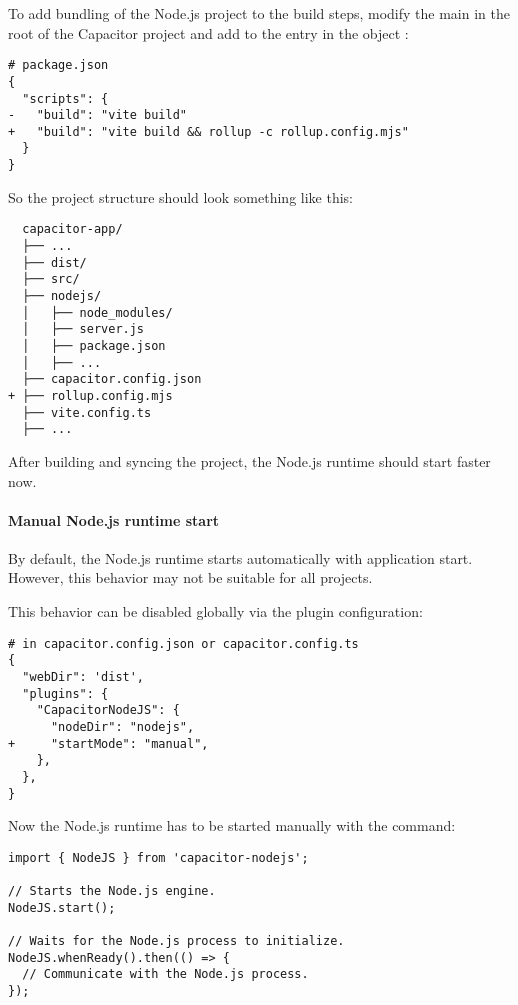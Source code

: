 To add bundling of the Node.js project to the build steps, modify the main  in the root of the Capacitor project 
and add  to the  entry in the  object \cite{npm, rollup}:

\begin{verbatim}
# package.json
{
  "scripts": {
-   "build": "vite build"
+   "build": "vite build && rollup -c rollup.config.mjs"
  }
}
\end{verbatim}

So the project structure should look something like this:

\begin{verbatim}
  capacitor-app/
  ├── ...
  ├── dist/
  ├── src/
  ├── nodejs/
  │   ├── node_modules/
  │   ├── server.js
  │   ├── package.json
  │   ├── ...
  ├── capacitor.config.json
+ ├── rollup.config.mjs
  ├── vite.config.ts
  ├── ... 
\end{verbatim}

After building and syncing the project, the Node.js runtime should start faster now.

\newpage

\paragraph{Manual Node.js runtime start}
\label{sec:Capacitor-NodeJS:ManualRuntimeStart}

By default, the Node.js runtime starts automatically with application start.
However, this behavior may not be suitable for all projects.

This behavior can be disabled globally via the  plugin configuration:

\begin{verbatim}
# in capacitor.config.json or capacitor.config.ts
{
  "webDir": 'dist',
  "plugins": {
    "CapacitorNodeJS": {
      "nodeDir": "nodejs",
+     "startMode": "manual",
    },
  },
} 
\end{verbatim}

Now the Node.js runtime has to be started manually with the  command:

\begin{verbatim}
import { NodeJS } from 'capacitor-nodejs';

// Starts the Node.js engine.
NodeJS.start();

// Waits for the Node.js process to initialize.
NodeJS.whenReady().then(() => {
  // Communicate with the Node.js process.
});
\end{verbatim}

